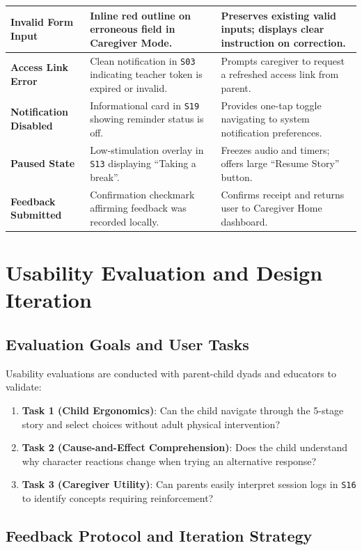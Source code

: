 \begin{xltabular}{\textwidth}{|p{3.2cm}|p{4.5cm}|X|}
\textbf{Invalid Form Input} & Inline red outline on erroneous field in Caregiver Mode. & Preserves existing valid inputs; displays clear instruction on correction. \\ \hline
\textbf{Access Link Error} & Clean notification in \texttt{S03} indicating teacher token is expired or invalid. & Prompts caregiver to request a refreshed access link from parent. \\ \hline
\textbf{Notification Disabled} & Informational card in \texttt{S19} showing reminder status is off. & Provides one-tap toggle navigating to system notification preferences. \\ \hline
\textbf{Paused State} & Low-stimulation overlay in \texttt{S13} displaying ``Taking a break''. & Freezes audio and timers; offers large ``Resume Story'' button. \\ \hline
\textbf{Feedback Submitted} & Confirmation checkmark affirming feedback was recorded locally. & Confirms receipt and returns user to Caregiver Home dashboard. \\ \hline
\end{xltabular}
\label{tab:c5_states}

\section{Usability Evaluation and Design Iteration}

\subsection{Evaluation Goals and User Tasks}

Usability evaluations are conducted with parent-child dyads and educators to validate:
\begin{enumerate}
    \item \textbf{Task 1 (Child Ergonomics)}: Can the child navigate through the 5-stage story and select choices without adult physical intervention?
    \item \textbf{Task 2 (Cause-and-Effect Comprehension)}: Does the child understand why character reactions change when trying an alternative response?
    \item \textbf{Task 3 (Caregiver Utility)}: Can parents easily interpret session logs in \texttt{S16} to identify concepts requiring reinforcement?
\end{enumerate}

\subsection{Feedback Protocol and Iteration Strategy}

